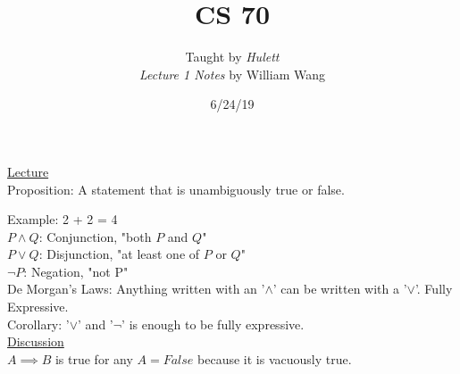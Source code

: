 \documentclass[a4paper]{article}
\title{\textbf{CS 70}}
\author{\large Taught by \textit{Hulett}\\
\textit{Lecture 1 Notes} by William Wang}
\date{6/24/19}
\newcommand{\<}{\langle}
\renewcommand{\>}{\rangle}
\renewcommand{\^}{\wedge}
\renewcommand{\v}{\vee}
\begin{document}
\maketitle
\newpage
\underline{Lecture}\\
Proposition: A statement that is unambiguously true or false.

\qquad Example: 2 + 2 = 4\\
\hline
$P \^ Q$: Conjunction, "both $P$ and $Q$"\\
$P \v Q$: Disjunction, "at least one of $P$ or $Q$"\\
$\neg P$: Negation, "not P"\\
\hline
De Morgan's Laws: Anything written with an '$\^$' can be written with a '$\v$'. Fully Expressive.\\
Corollary: '$\v$' and '$\neg$' is enough to be fully expressive.\\

\newpage
\underline{Discussion}\\
$A \implies B$ is true for any $A = False$ because it is vacuously true.\\
\end{document}
